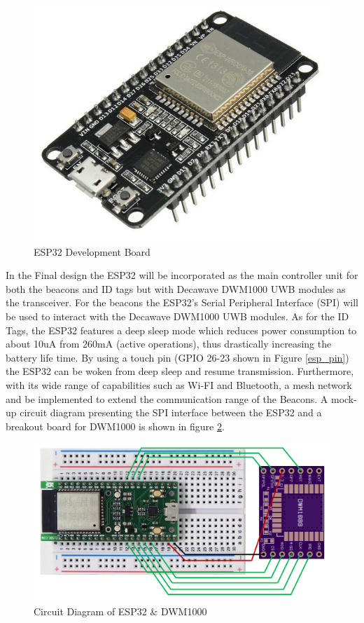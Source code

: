 \begin{figure}[H]
\centering
    \includegraphics[scale=0.25]{./images/esp.jpg}
    \caption{ESP32 Development Board}
    \label{esp}
\end{figure}


\pagebreak
In the Final design the ESP32 will be incorporated as the main controller unit for both the beacons and ID tags but with Decawave DWM1000 UWB modules as the transceiver. For the beacons the ESP32’s Serial Peripheral Interface (SPI) will be used to interact with the Decawave DWM1000 UWB modules. As for the ID Tags, the ESP32 features a deep sleep mode which reduces power consumption to about 10uA from 260mA (active operations), thus drastically increasing the battery life time. By using a touch pin (GPIO 26-23 shown in Figure \ref{esp_pin}) the ESP32 can be woken from deep sleep and resume transmission. Furthermore, with its wide range of capabilities such as Wi-FI and Bluetooth, a mesh network and be implemented to extend the communication range of the Beacons. A mock-up circuit diagram presenting the SPI interface between the ESP32 and a breakout board for DWM1000 is shown in figure \ref{eps_dwm_circuit}.

\medskip
\begin{figure}[H]
\centering
    \includegraphics[scale=0.5]{./images/eps_dwm_circuit.png}
    \caption{Circuit Diagram of ESP32 \& DWM1000}
    \label{eps_dwm_circuit}
\end{figure}

